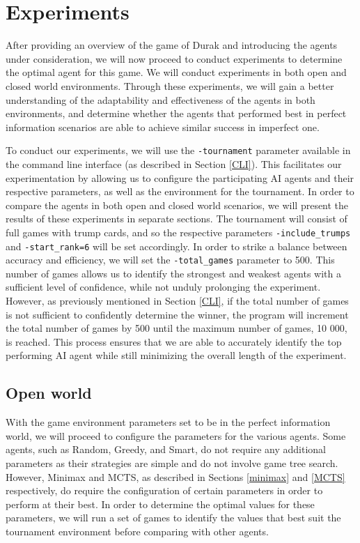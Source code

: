 \chapter{Experiments}

After providing an overview of the game of Durak and introducing the agents under consideration, we will now proceed to conduct experiments to determine the optimal agent for this game. We will conduct experiments in both open and closed world environments. Through these experiments, we will gain a better understanding of the adaptability and effectiveness of the agents in both environments, and determine whether the agents that performed best in perfect information scenarios are able to achieve similar success in imperfect one.

To conduct our experiments, we will use the \texttt{-tournament} parameter available in the command line interface (as described in Section \ref{CLI}). This facilitates our experimentation by allowing us to configure the participating AI agents and their respective parameters, as well as the environment for the tournament. In order to compare the agents in both open and closed world scenarios, we will present the results of these experiments in separate sections. The tournament will consist of full games with trump cards, and so the respective parameters \texttt{-include\_trumps} and \texttt{-start\_rank=6} will be set accordingly. In order to strike a balance between accuracy and efficiency, we will set the \texttt{-total\_games} parameter to 500. This number of games allows us to identify the strongest and weakest agents with a sufficient level of confidence, while not unduly prolonging the experiment. However, as previously mentioned in Section \ref{CLI}, if the total number of games is not sufficient to confidently determine the winner, the program will increment the total number of games by 500 until the maximum number of games, 10 000, is reached. This process ensures that we are able to accurately identify the top performing AI agent while still minimizing the overall length of the experiment.

\section{Open world}

With the game environment parameters set to be  in the perfect information world, we will proceed to configure the parameters for the various agents. Some agents, such as Random, Greedy, and Smart, do not require any additional parameters as their strategies are simple and do not involve game tree search. However, Minimax and MCTS, as described in Sections \ref{minimax} and \ref{MCTS} respectively, do require the configuration of certain parameters in order to perform at their best. In order to determine the optimal values for these parameters, we will run a set of games to identify the values that best suit the tournament environment before comparing with other agents.

